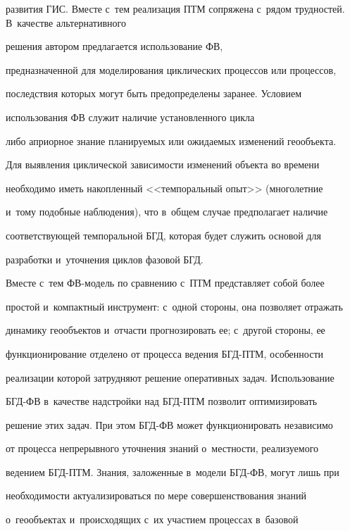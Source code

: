 развития ГИС. Вместе с~тем реализация ПТМ сопряжена с~рядом трудностей. В~качестве альтернативного 


решения автором предлагается использование ФВ, 


пред\-на\-зна\-чен\-ной для моделирования цик\-ли\-че\-ских процессов или процессов, 


последствия которых могут быть пред\-опре\-де\-ле\-ны заранее. Условием 


использования ФВ служит наличие установленного цик\-ла 


либо априорное знание пла\-ни\-ру\-емых или ожи\-да\-емых изменений геообъекта. 


  


  Для выявления циклической за\-ви\-си\-мости изменений объекта во времени 


необходимо иметь накопленный <<темпоральный опыт>> (многолетние 


и~тому подобные наблюдения), что в~общем случае предполагает наличие 


со\-от\-вет\-ст\-ву\-ющей темпоральной БГД, которая будет служить основой для 


разработки и~уточ\-не\-ния цик\-лов фазовой БГД.


  


  Вместе с~тем ФВ-модель по сравнению с~ПТМ пред\-став\-ля\-ет собой более 


прос\-той и~компактный инструмент: с~одной стороны, она позволяет отражать 


динамику геообъектов и~отчасти прогнозировать ее; с~другой стороны, ее 


функционирование отделено от процесса ведения БГД-ПТМ, особенности 


реализации которой за\-труд\-ня\-ют решение оперативных задач. Использование 


БГД-ФВ в~качестве надстройки над БГД-ПТМ позволит оптимизировать 


решение этих задач. При этом БГД-ФВ может функционировать независимо 


от процесса непрерывного уточнения знаний о~мест\-ности, ре\-а\-ли\-зу\-емо\-го 


ведением БГД-ПТМ. Знания, заложенные в~модели БГД-ФВ, могут лишь при 


не\-об\-хо\-ди\-мости актуализироваться по мере совершенствования знаний 


о~геообъектах и~происходящих с~их участием процессах в~базовой 


